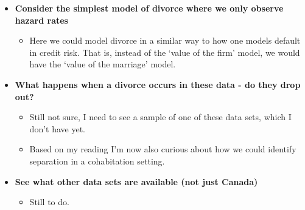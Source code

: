 \documentclass{article}
\begin{document}
\begin{itemize}
\item \textbf{Consider the simplest model of divorce where we only observe hazard rates}
\begin{itemize}
\item Here we could model divorce in a similar way to how one models default in credit risk. That is, instead of the `value of the firm' model, we would have the `value of the marriage' model.
\end{itemize}



\item \textbf{What happens when a divorce occurs in these data - do they drop out?}
\begin{itemize}
\item Still not sure, I need to see a sample of one of these data sets, which I don't have yet.
\item Based on my reading I'm now also curious about how we could identify separation in a cohabitation setting.
\end{itemize}

\item \textbf{See what other data sets are available (not just Canada)}
\begin{itemize}
\item Still to do.
\end{itemize}

\end{itemize}

\newpage
\end{document}
